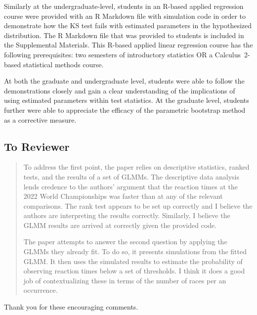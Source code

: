 \documentclass[12pt]{article}
\newenvironment{comment}%
{\begin{quotation}\noindent\small\it\color{darkblue}\ignorespaces%
}{\end{quotation}}
\begin{document}
Similarly at the undergraduate-level, students in an R-based applied regression 
course were provided with an R Markdown file with simulation code in order to 
demonstrate how the KS test fails with estimated parameters in the hypothesized 
distribution. The R Markdown file that was provided to students is included in 
the Supplemental Materials. This R-based applied linear regression course 
has the following prerequisites: two semesters of introductory statistics OR a 
Calculus~2-based statistical methods course.


At both the graduate and undergraduate level, students were able to follow the 
demonstrations closely and gain a clear understanding of the implications of 
using estimated parameters within test statistics.  At the graduate level, 
students further were able to appreciate the efficacy of the parametric 
bootstrap method as a corrective measure.



\subsection*{To Reviewer}


\begin{comment}
To address the first point, the paper relies on descriptive statistics, ranked
tests, and the results of a set of GLMMs. The descriptive data analysis lends
credence to the authors' argument that the reaction times at the 2022 World
Championships was faster than at any of the relevant comparisons. The rank test
appears to be set up correctly and I believe the authors are interpreting the
results correctly. Similarly, I believe the GLMM results are arrived at
correctly given the provided code.

The paper attempts to answer the second question by applying the GLMMs they
already fit. To do so, it presents simulations from the fitted GLMM. It then
uses the simulated results to estimate the probability of observing reaction
times below a set of thresholds. I think it does a good job of contextualizing
these in terms of the number of races per an occurrence.
\end{comment}


Thank you for these encouraging comments.  
\end{document}
